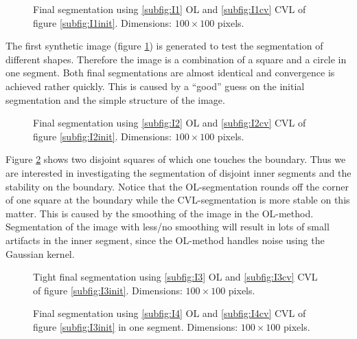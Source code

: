 \begin{figure}[h]
  \centering
  \caption{Final segmentation using \ref{subfig:I1} OL and \ref{subfig:I1cv} CVL of figure \ref{subfig:I1init}. Dimensions: $100\times 100$ pixels.}\label{I1}
\end{figure}

The first synthetic image (figure \ref{I1}) is generated to test the segmentation of different shapes. Therefore the image is a combination of a square and a circle in one segment. Both final segmentations are almost identical and convergence is achieved rather quickly. This is caused by a ``good'' guess on the initial segmentation and the simple structure of the image.\\

\begin{figure}[h]
  \centering
  \caption{Final segmentation using \ref{subfig:I2} OL and \ref{subfig:I2cv} CVL of figure \ref{subfig:I2init}. Dimensions: $100\times 100$ pixels.}\label{I2}
\end{figure}

Figure \ref{I2} shows two disjoint squares of which one touches the boundary. Thus we are interested in investigating the segmentation of disjoint inner segments and the stability on the boundary. Notice that the OL-segmentation rounds off the corner of one square at the boundary while the CVL-segmentation is more stable on this matter. This is caused by the smoothing of the image in the OL-method. Segmentation of the image with less/no smoothing will result in lots of small artifacts in the inner segment, since the OL-method handles noise using the Gaussian kernel.\\

\begin{figure}[h]
  \centering
  \caption{Tight final segmentation using \ref{subfig:I3} OL and \ref{subfig:I3cv} CVL of figure \ref{subfig:I3init}. Dimensions: $100\times 100$ pixels.}\label{I3}
\end{figure}
\begin{figure}[h]
  \centering
  \caption{Final segmentation using \ref{subfig:I4} OL and \ref{subfig:I4cv} CVL of figure \ref{subfig:I3init} in one segment. Dimensions: $100\times 100$ pixels.}\label{I4}
\end{figure}


